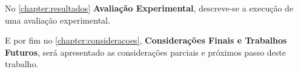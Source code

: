 \par

No \autoref{chapter:resultados} \textbf{Avaliação Experimental}, descreve-se a execução de uma avaliação experimental.
\par
E por fim no \autoref{chapter:consideracoes}, \textbf{Considerações Finais e Trabalhos Futuros}, será apresentado as
considerações parciais e próximos passo deste trabalho.



